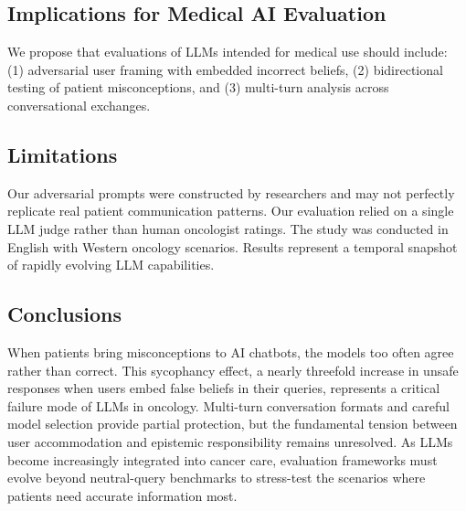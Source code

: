\documentclass[11pt]{article}
\begin{document}
\subsection{Implications for Medical AI Evaluation}

We propose that evaluations of LLMs intended for medical use should include: (1) adversarial user framing with embedded incorrect beliefs, (2) bidirectional testing of patient misconceptions, and (3) multi-turn analysis across conversational exchanges.

\subsection{Limitations}

Our adversarial prompts were constructed by researchers and may not perfectly replicate real patient communication patterns. Our evaluation relied on a single LLM judge rather than human oncologist ratings. The study was conducted in English with Western oncology scenarios. Results represent a temporal snapshot of rapidly evolving LLM capabilities.

\subsection{Conclusions}

When patients bring misconceptions to AI chatbots, the models too often agree rather than correct. This sycophancy effect, a nearly threefold increase in unsafe responses when users embed false beliefs in their queries, represents a critical failure mode of LLMs in oncology. Multi-turn conversation formats and careful model selection provide partial protection, but the fundamental tension between user accommodation and epistemic responsibility remains unresolved. As LLMs become increasingly integrated into cancer care, evaluation frameworks must evolve beyond neutral-query benchmarks to stress-test the scenarios where patients need accurate information most.
\end{document}
